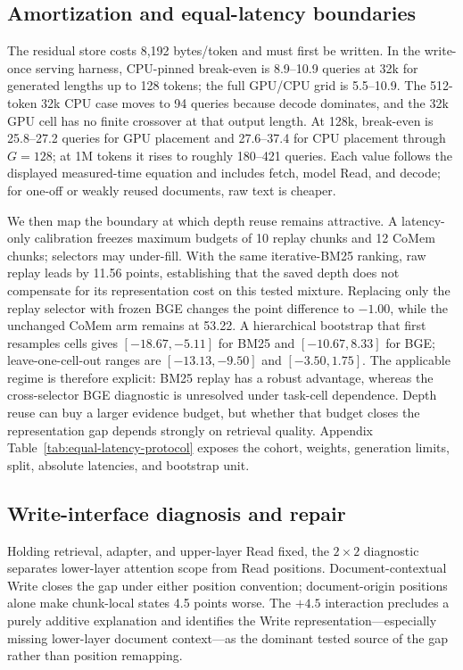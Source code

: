 \subsection{Amortization and equal-latency boundaries}

The residual store costs 8,192 bytes/token and must first be written. In the
write-once serving harness, CPU-pinned break-even is 8.9--10.9 queries at 32k
for generated lengths up to 128 tokens; the full GPU/CPU grid is 5.5--10.9.
The 512-token 32k CPU case moves to 94 queries because decode dominates, and
the 32k GPU cell has no finite crossover at that output length. At 128k,
break-even is 25.8--27.2 queries for GPU placement and 27.6--37.4 for CPU
placement through $G{=}128$; at 1M tokens it rises to roughly 180--421 queries.
Each value follows the displayed measured-time equation and includes fetch,
model Read, and decode; for one-off or weakly reused documents, raw text is
cheaper.

We then map the boundary at which depth reuse remains attractive. A latency-only
calibration freezes maximum budgets of 10 replay chunks and 12 CoMem chunks;
selectors may under-fill. With the same iterative-BM25 ranking, raw replay leads
by 11.56 points, establishing that the saved depth does not compensate for its
representation cost on this tested mixture. Replacing only the replay selector
with frozen BGE changes the point difference to $-1.00$, while the unchanged
CoMem arm remains at 53.22. A hierarchical bootstrap that first resamples cells gives
$[-18.67,-5.11]$ for BM25 and $[-10.67,8.33]$ for BGE; leave-one-cell-out
ranges are $[-13.13,-9.50]$ and $[-3.50,1.75]$. The applicable regime is
therefore explicit: BM25 replay has a robust advantage, whereas the
cross-selector BGE diagnostic is unresolved under task-cell dependence. Depth
reuse can buy a larger evidence budget, but whether that budget closes the
representation gap depends strongly on retrieval quality.
Appendix Table~\ref{tab:equal-latency-protocol} exposes the cohort, weights,
generation limits, split, absolute latencies, and bootstrap unit.

\subsection{Write-interface diagnosis and repair}


Holding retrieval, adapter, and upper-layer Read fixed, the $2{\times}2$
diagnostic separates lower-layer attention scope from Read positions.
Document-contextual Write closes the gap under either position convention;
document-origin positions alone make chunk-local states 4.5 points worse. The $+4.5$ interaction precludes a purely additive explanation and identifies
the Write representation---especially missing lower-layer document context---as
the dominant tested source of the gap rather than position remapping.

